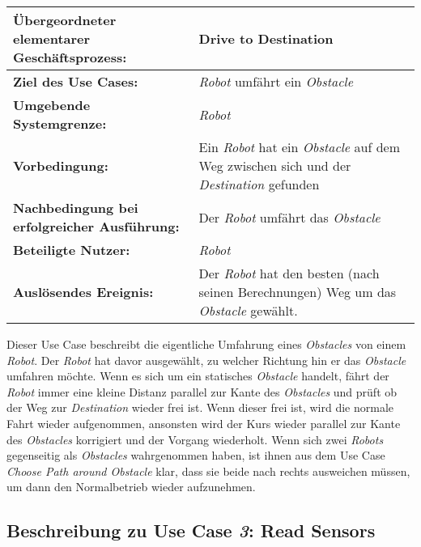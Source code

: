			\begin{table}[H]
				\centering
				\begin{tabularx}{\textwidth}{@{}p{5cm}X@{}}
				\hline
				\textbf{Übergeordneter elementarer Geschäftsprozess:} & Drive to Destination\\ \hline
				\textbf{Ziel des Use Cases:} & \emph{Robot} umfährt ein \emph{Obstacle} \\ \hline
				\textbf{Umgebende Systemgrenze:} & \emph{Robot} \\ \hline
				\textbf{Vorbedingung:} & Ein \emph{Robot} hat ein \emph{Obstacle} auf dem Weg zwischen sich und der \emph{Destination} gefunden\\ \hline
				\textbf{Nachbedingung bei erfolgreicher Ausführung:} & 
				Der \emph{Robot} umfährt das \emph{Obstacle} \\ \hline
				\textbf{Beteiligte Nutzer:} & \emph{Robot} \\ \hline
				\textbf{Auslösendes Ereignis:} & Der \emph{Robot} hat den besten (nach seinen Berechnungen) Weg um das \emph{Obstacle} gewählt. \\ \hline
				\end{tabularx}
			\end{table}
		Dieser Use Case beschreibt die eigentliche Umfahrung eines \emph{Obstacles} von einem \emph{Robot}. Der \emph{Robot} hat davor ausgewählt, zu welcher Richtung hin er das \emph{Obstacle} umfahren möchte. Wenn es sich um ein statisches \emph{Obstacle} handelt, fährt der \emph{Robot} immer eine kleine Distanz parallel zur Kante des \emph{Obstacles} und prüft ob der Weg zur \emph{Destination} wieder frei ist. Wenn dieser frei ist, wird die normale Fahrt wieder aufgenommen, ansonsten wird der Kurs wieder parallel zur Kante des \emph{Obstacles} korrigiert und der Vorgang wiederholt. Wenn sich zwei \emph{Robots} gegenseitig als \emph{Obstacles} wahrgenommen haben, ist ihnen aus dem Use Case \textit{Choose Path around Obstacle} klar, dass sie beide nach rechts ausweichen müssen, um dann den Normalbetrieb wieder aufzunehmen.
			
			
		\pagebreak

		\subsection{Beschreibung zu Use Case \emph{3}: Read Sensors}

